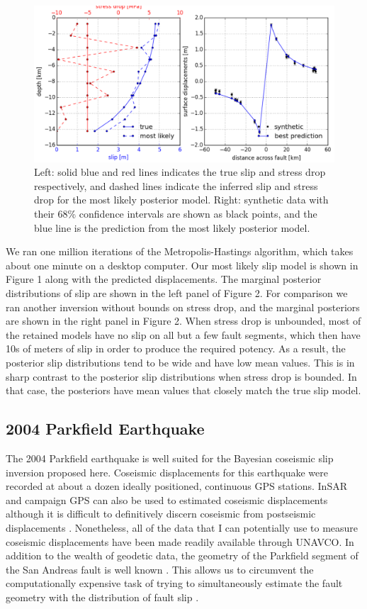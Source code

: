 \documentclass[12pt]{article}
\begin{document}
\begin{figure}
\includegraphics[width=1.0\textwidth]{figure_1}
\caption{Left: solid blue and red lines indicates the true slip and stress drop respectively, and dashed lines indicate the inferred slip and stress drop for the most likely posterior model.  Right: synthetic data with their 68\% confidence intervals are shown as black points, and the blue line is the prediction from the most likely posterior model.}  
\end{figure}

We ran one million iterations of the Metropolis-Hastings algorithm, which takes about one minute on a desktop computer.  Our most likely slip model is shown in Figure 1 along with the predicted displacements.  The marginal posterior distributions of slip are shown in the left panel of Figure 2.  For comparison we ran another inversion without bounds on stress drop, and the marginal posteriors are shown in the right panel in Figure 2.  When stress drop is unbounded, most of the retained models have no slip on all but a few fault segments, which then have 10s of meters of slip in order to produce the required potency.  As a result, the posterior slip distributions tend to be wide and have low mean values.  This is in sharp contrast to the posterior slip distributions when stress drop is bounded.  In that case, the posteriors have mean values that closely match the true slip model.   

\subsection*{2004 Parkfield Earthquake}
The 2004 Parkfield earthquake is well suited for the Bayesian coseismic slip inversion proposed here.  Coseismic displacements for this earthquake were recorded at about a dozen ideally positioned, continuous GPS stations. InSAR and campaign GPS can also be used to estimated coseismic displacements although it is difficult to definitively discern coseismic from postseismic displacements \citep{Johanson2006}. Nonetheless, all of the data that I can potentially use to measure coseismic displacements have been made readily available through UNAVCO.  In addition to the wealth of geodetic data, the geometry of the Parkfield segment of the San Andreas fault is well known \citep{Simpson2006}.  This allows us to circumvent the computationally expensive task of trying to simultaneously estimate the fault geometry with the distribution of fault slip \citep[e.g.][]{Fukuda2008}. 
\end{document}
